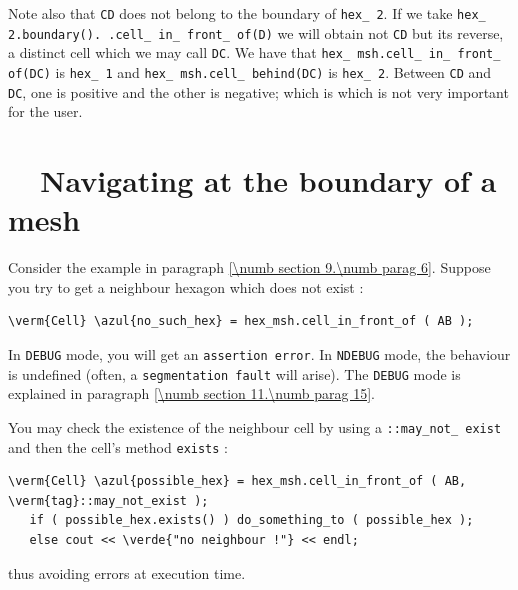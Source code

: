 Note also that {\small\tt CD} does not belong to the boundary of {\small\tt hex\_\,2}.
If we take {\small\tt hex\_\,2.boundary(). .cell\_\,in\_\,front\_\,of(D)} we will obtain not
{\small\tt CD} but its reverse, a distinct cell which we may call {\small\tt DC}.
We have that {\small\tt hex\_\,msh.cell\_\,in\_\,front\_\,of(DC)} is {\small\tt hex\_\,1} and
{\small\tt hex\_\,msh.cell\_\,behind(DC)} is {\small\tt hex\_\,2}.
Between {\small\tt CD} and {\small\tt DC}, one is positive and the other is negative;
which is which is not very important for the user.


\section{~~Navigating at the boundary of a mesh}\label{\numb section 9.\numb parag 7}

Consider the example in paragraph \ref{\numb section 9.\numb parag 6}.
Suppose you try to get a neighbour hexagon which does not exist :

\begin{Verbatim}[commandchars=\\\{\},formatcom=\small\tt,
   baselinestretch=0.94,framesep=2mm                      ]
   \verm{Cell} \azul{no_such_hex} = hex_msh.cell_in_front_of ( AB );
\end{Verbatim}

In {\small\tt DEBUG} mode, you will get an {\small\tt assertion error}.
In {\small\tt NDEBUG} mode, the behaviour is undefined
(often, a {\small\tt segmentation fault} will arise).
The {\small\tt DEBUG} mode is explained in paragraph \ref{\numb section 11.\numb parag 15}.

You may check the existence of the neighbour cell by using a
{\small\tt {}::may\_\;not\_\,exist} and then the cell's method {\small\tt exists} :

\begin{Verbatim}[commandchars=\\\{\},formatcom=\small\tt,
   baselinestretch=0.94,framesep=2mm                      ]
   \verm{Cell} \azul{possible_hex} = hex_msh.cell_in_front_of ( AB, \verm{tag}::may_not_exist );
   if ( possible_hex.exists() ) do_something_to ( possible_hex );
   else cout << \verde{"no neighbour !"} << endl;
\end{Verbatim}

\noindent thus avoiding errors at execution time.

